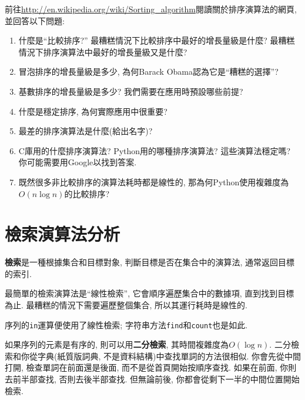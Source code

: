 \documentclass[10pt]{book}
\begin{document}
\begin{exercise}

前往\url{http://en.wikipedia.org/wiki/Sorting_algorithm}閱讀關於排序演算法的網頁, 
並回答以下問題:

\begin{enumerate}

\item 什麼是``比較排序?'' 最糟糕情況下比較排序中最好的增長量級是什麼? 
最糟糕情況下排序演算法中最好的增長量級又是什麼?

\item 冒泡排序的增長量級是多少, 為何Barack Obama認為它是``糟糕的選擇''?

\item 基數排序的增長量級是多少? 我們需要在應用時預設哪些前提?

\item 什麼是穩定排序, 為何實際應用中很重要?

\item 最差的排序演算法是什麼(給出名字)?

\item C庫用的什麼排序演算法? Python用的哪種排序演算法? 這些演算法穩定嗎?
你可能需要用Google以找到答案.

\item 既然很多非比較排序的演算法耗時都是線性的, 
那為何Python使用複雜度為$O(n \log n)$的比較排序?

\end{enumerate}

\end{exercise}


\section{檢索演算法分析}

{\bf 檢索}是一種根據集合和目標對象, 判斷目標是否在集合中的演算法, 
通常返回目標的索引. 

最簡單的檢索演算法是``線性檢索'', 它會順序遍歷集合中的數據項, 直到找到目標為止. 
最糟糕的情況下需要遍歷整個集合, 所以其運行耗時是線性的.

序列的{\tt in}運算便使用了線性檢索;
字符串方法{\tt find}和{\tt count}也是如此.

如果序列的元素是有序的, 則可以用{\bf 二分檢索}, 其時間複雜度為$O(\log n)$. 
二分檢索和你從字典(紙質版詞典, 不是資料結構)中查找單詞的方法很相似. 
你會先從中間打開, 檢查單詞在前面還是後面, 而不是從首頁開始按順序查找. 
如果在前面, 你則去前半部查找, 否則去後半部查找. 
但無論前後, 你都會從剩下一半的中間位置開始檢索. 
\end{document}
